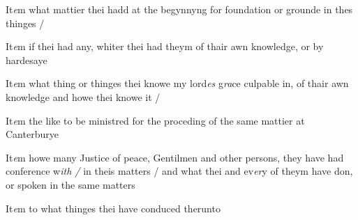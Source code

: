 \documentclass[12pt, a4paper]{book}
\begin{document}
            		
            			
				\marginpar[\vspace{0.5cm}{\textcolor{Gray}{4}}]{}
			
            			
		\ifthenelse{\isodd{\thepage}}
		{\reversemarginpar}
		{\normalmarginpar}
		 It\textit{e}m what mattier thei hadd at the begynnyng for
 foundation or grounde in thes thinges /
            		

            		
            			
				\marginpar[\vspace{0.5cm}{\textcolor{Gray}{5}}]{}
			
            			
		\ifthenelse{\isodd{\thepage}}
		{\reversemarginpar}
		{\normalmarginpar}
		 It\textit{e}m if thei had any, whiter thei had theym of thair
 awn knowledge, or by hardesaye
 
            		
            		
            			
				\marginpar[\vspace{0.5cm}{\textcolor{Gray}{6}}]{}
			
            			
		\ifthenelse{\isodd{\thepage}}
		{\reversemarginpar}
		{\normalmarginpar}
		 It\textit{e}m what thing or thinges thei knowe my lord\textit{es} g\textit{ra}ce
 culpable in, of thair awn knowledge and howe
 thei knowe it /
            		
            		
				\marginpar[\vspace{0.5cm}{\textcolor{Gray}{7}}]{}
			 
		\ifthenelse{\isodd{\thepage}}
		{\reversemarginpar}
		{\normalmarginpar}
		 It\textit{e}m the like to be ministred for the proceding of the
	same mattier at Canterburye
 
            		
				\marginpar[\vspace{0.5cm}{\textcolor{Gray}{8}}]{}
			 
		\ifthenelse{\isodd{\thepage}}
		{\reversemarginpar}
		{\normalmarginpar}
		 It\textit{e}m howe many Justice of peace, Gentilmen and other
 persons, they have had conference w\textit{ith /} in theis matters /
 and what thei and ev\textit{er}y of theym have don, or spoken
 in the same matters
 
            		
				\marginpar[\vspace{0.5cm}{\textcolor{Gray}{9}}]{}
			 
		\ifthenelse{\isodd{\thepage}}
		{\reversemarginpar}
		{\normalmarginpar}
		 It\textit{e}m to what thinges thei have conduced therunto
 
\end{document}
